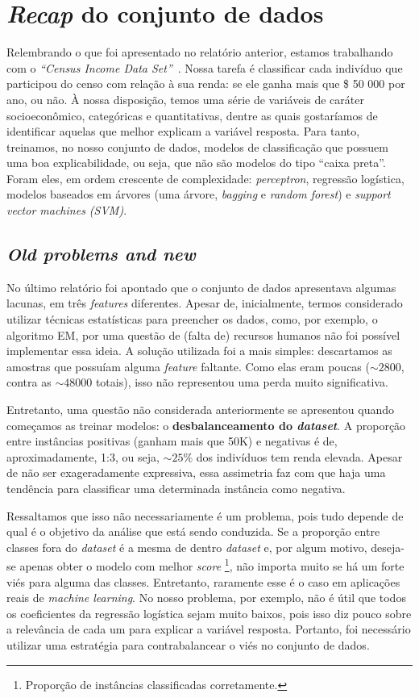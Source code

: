 \section{\emph{Recap} do conjunto de dados}

Relembrando o que foi apresentado no relatório anterior, estamos trabalhando com o \emph{``Census Income Data Set''}~\cite{uci}.
Nossa tarefa é classificar cada indivíduo que participou do censo com relação à sua renda: se ele ganha mais que \$ 50 000 por ano, ou não.
À nossa disposição, temos uma série de variáveis de caráter socioeconômico, categóricas e quantitativas, dentre as quais gostaríamos de identificar aquelas que melhor explicam a variável resposta.
Para tanto, treinamos, no nosso conjunto de dados, modelos de classificação que possuem uma boa explicabilidade, ou seja, que não são modelos do tipo ``caixa preta''.
Foram eles, em ordem crescente de complexidade: \emph{perceptron}, regressão logística, modelos baseados em árvores (uma árvore, \emph{bagging} e \emph{random forest}) e \emph{support vector machines (SVM)}.

\subsection{\emph{Old problems and new}}

No último relatório foi apontado que o conjunto de dados apresentava algumas lacunas, em três \emph{features} diferentes.
Apesar de, inicialmente, termos considerado utilizar técnicas estatísticas para preencher os dados, como, por exemplo, o algoritmo EM, por uma questão de (falta de) recursos humanos não foi possível implementar essa ideia.
A solução utilizada foi a mais simples: descartamos as amostras que possuíam alguma \emph{feature} faltante.
Como elas eram poucas (\( \sim 2800 \), contra as \( \sim 48 000 \) totais), isso não representou uma perda muito significativa.

Entretanto, uma questão não considerada anteriormente se apresentou quando começamos as treinar modelos: o \textbf{desbalanceamento do \emph{dataset}}.
A proporção entre instâncias positivas (ganham mais que 50K) e negativas é de, aproximadamente, 1:3, ou seja, \( \sim 25 \% \) dos indivíduos tem renda elevada.
Apesar de não ser exageradamente expressiva, essa assimetria faz com que haja uma tendência para classificar uma determinada instância como negativa.

Ressaltamos que isso não necessariamente é um problema, pois tudo depende de qual é o objetivo da análise que está sendo conduzida.
Se a proporção entre classes fora do \emph{dataset} é a mesma de dentro \emph{dataset} e, por algum motivo, deseja-se apenas obter o modelo com melhor \emph{score}
\footnote{Proporção de instâncias classificadas corretamente.},
não importa muito se há um forte viés para alguma das classes.
Entretanto, raramente esse é o caso em aplicações reais de \emph{machine learning}.
No nosso problema, por exemplo, não é útil que todos os coeficientes da regressão logística sejam muito baixos, pois isso diz pouco sobre a relevância de cada um para explicar a variável resposta.
Portanto, foi necessário utilizar uma estratégia para contrabalancear o viés no conjunto de dados.
